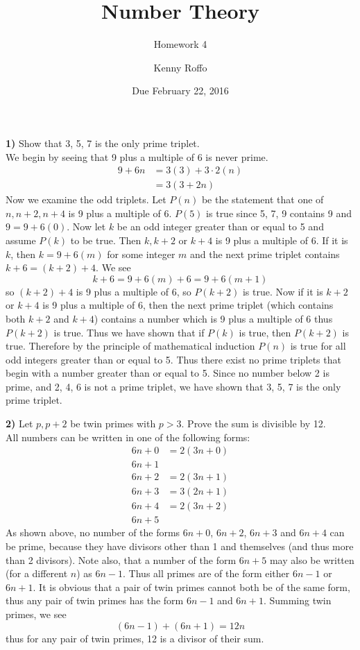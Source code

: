 \documentclass{scrartcl}
\title{Number Theory}
\subtitle{Homework 4}
\author{Kenny Roffo}
\date{Due February 22, 2016}
\begin{document}
\maketitle

\textbf{1)} Show that 3, 5, 7 is the only prime triplet.\\

We begin by seeing that 9 plus a multiple of 6 is never prime.
\begin{align*}
  9 + 6n &= 3(3) + 3\cdot2(n)\\
  &= 3\left(3 + 2n\right)
\end{align*}
Now we examine the odd triplets. Let $P(n)$ be the statement that one of $n, n+2, n+4$ is 9 plus a multiple of 6. $P(5)$ is true since 5, 7, 9 contains 9 and $9 = 9 + 6(0)$. Now let $k$ be an odd integer greater than or equal to 5 and assume $P(k)$ to be true. Then $k, k+2$ or $k+4$ is 9 plus a multiple of 6. If it is $k$, then $k=9+6(m)$ for some integer $m$ and the next prime triplet contains $k+6 = (k+2)+4$. We see $$k+6 = 9 + 6(m) + 6 = 9 + 6(m+1)$$ so $(k+2)+4$ is 9 plus a multiple of 6, so $P(k+2)$ is true. Now if it is $k+2$ or $k+4$ is 9 plus a multiple of 6, then the next prime triplet (which contains both $k+2$ and $k+4$) contains a number which is 9 plus a multiple of 6 thus $P(k+2)$ is true. Thus we have shown that if $P(k)$ is true, then $P(k+2)$ is true. Therefore by the principle of mathematical induction $P(n)$ is true for all odd integers greater than or equal to 5. Thus there exist no prime triplets that begin with a number greater than or equal to 5. Since no number below 2 is prime, and 2, 4, 6 is not a prime triplet, we have shown that 3, 5, 7 is the only prime triplet.\pagebreak

\textbf{2)} Let $p, p+2$ be twin primes with $p>3$. Prove the sum is divisible by 12.\\

All numbers can be written in one of the following forms:
\begin{align*}
  6n+0 &= 2(3n+0)\\
  6n+1\\
  6n+2 &= 2(3n+1)\\
  6n+3 &= 3(2n+1)\\
  6n+4 &= 2(3n+2)\\
  6n+5
\end{align*}
As shown above, no number of the forms $6n+0$, $6n+2$, $6n+3$ and $6n+4$ can be prime, because they have divisors other than 1 and themselves (and thus more than 2 divisors). Note also, that a number of the form $6n+5$ may also be written (for a different $n$) as $6n-1$. Thus all primes are of the form either $6n-1$ or $6n+1$. It is obvious that a pair of twin primes cannot both be of the same form, thus any pair of twin primes has the form $6n-1$ and $6n+1$. Summing twin primes, we see $$ (6n-1)+(6n+1) = 12n $$ thus for any pair of twin primes, 12 is a divisor of their sum.\\
\end{document}
